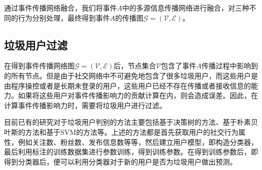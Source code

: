 通过事件传播网络融合，我们将事件$A$中的多源信息传播网络进行融合，对三种不同的行为分别处理，最终得到事件$A$的传播图$\mathcal{G}=\left(\mathcal{V},\mathcal{E}\right)$。

\subsection{垃圾用户过滤}
\label{subsec5:spam}
在得到事件传播网络图$\mathcal{G}=\left(\mathcal{V},\mathcal{E}\right)$后，节点集合$\mathcal{V}$包含了事件$A$传播过程中影响到的所有节点。但是由于社交网络中不可避免地包含了很多垃圾用户，而这些用户是由程序操控或者是长期未登录的用户，这些用户已经不存在传播或者接收信息的能力。如果将这些用户对事件传播影响力的贡献计算在内，则会造成误差。因此，在计算事件传播影响力时，需要将垃圾用户进行过滤。

目前已有的研究对于垃圾用户判别的方法主要包括基于决策树的方法、基于朴素贝叶斯的方法和基于SVM的方法等。上述的方法都是首先获取用户的社交行为属性，例如关注数、粉丝数、发布信息数等等，然后建立用户模型，即构造分类器，最后利用标注的训练数据集进行参数训练，得到训练参数。在得到训练参数后，即得到分类器后，便可以利用分类器对于新的用户是否为垃圾用户做出预测。

